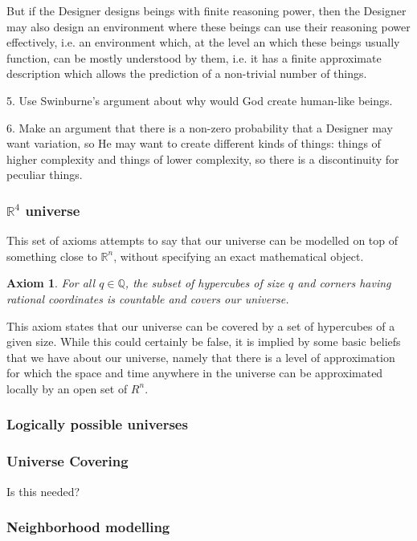 \documentclass[a4paper
,draft
]{article}
\def\reale{\mathbb{R}}
\def\rationale{\mathbb{Q}}
\newtheorem{axiom}{Axiom}
\begin{document}
But if the Designer designs beings with finite reasoning power,
then the Designer may also design an environment where these beings
can use their reasoning power effectively, i.e. an environment which,
at the level an which these beings usually function,
can be mostly understood by them, i.e. it has a finite
approximate description which allows the prediction of a non-trivial
number of things.

5. Use Swinburne's argument about why would God create human-like beings.

6. Make an argument that there is a non-zero probability that
a Designer may want variation, so He may want to create different
kinds of things: things of higher complexity and things of lower complexity,
so there is a discontinuity for peculiar things.

\subsubsection{$\reale^4$ universe}

This set of axioms attempts to say that our universe can be modelled
on top of something close to $\reale^n$, without specifying an exact
mathematical object.

\begin{axiom}\label{unitycovering}
  For all $q\in\rationale$, the subset of hypercubes of size $q$ and corners
  having rational coordinates is countable and covers our universe.
\end{axiom}

This axiom states that our universe can be covered by a set of hypercubes
of a given size. While this could certainly be false, it is implied by some
basic beliefs that we have about our universe, namely that there is a
level of approximation for which the space and time anywhere in the universe
can be approximated locally by an open set of $R^n$.

\subsubsection{Logically possible universes}
\subsubsection{Universe Covering}
Is this needed?
\subsubsection{Neighborhood modelling}
\end{document}
